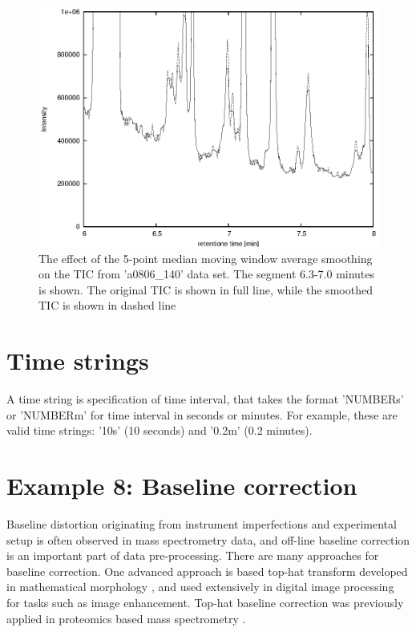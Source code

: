 \begin{figure}[htp]
\begin{center}
\includegraphics{graphics/pyms-test/tic_median_smoothed.eps}
\caption{The effect of the 5-point median moving window average smoothing
on the TIC from 'a0806\_140' data set. The segment 6.3-7.0 minutes is
shown. The original TIC is shown in full line, while the smoothed TIC
is shown in dashed line}
\label{fig:smoothed-median}
\end{center}
\end{figure}

\section{Time strings}
\label{sec:time-string}

A time string is specification of time interval, that takes the format
'NUMBERs' or 'NUMBERm' for time interval in seconds or minutes. For
example, these are valid time strings: '10s' (10 seconds) and '0.2m'
(0.2 minutes).

\section{\label{sec:baseline_correction}Example 8: Baseline correction}


Baseline distortion originating from instrument imperfections and experimental
setup is often observed in mass spectrometry data, and off-line baseline correction
is an important part of data pre-processing. There are many approaches for
baseline correction. One advanced approach is based top-hat transform developed
in mathematical morphology \cite{serra83}, and used extensively in digital image
processing for tasks such as image enhancement.  Top-hat baseline correction was
previously applied in proteomics based mass spectrometry \cite{sauve04}.

